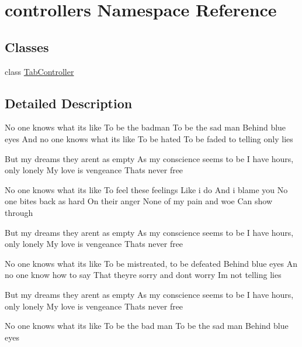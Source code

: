 \hypertarget{namespacecontrollers}{}\section{controllers Namespace Reference}
\label{namespacecontrollers}
\subsection*{Classes}
\begin{DoxyCompactItemize}
\item 
class \hyperlink{classcontrollers_1_1_tab_controller}{Tab\+Controller}
\end{DoxyCompactItemize}


\subsection{Detailed Description}
No one knows what it\textquotesingle{}s like To be the badman To be the sad man Behind blue eyes And no one knows what it\textquotesingle{}s like To be hated To be faded to telling only lies

But my dreams they aren\textquotesingle{}t as empty As my conscience seems to be I have hours, only lonely My love is vengeance That\textquotesingle{}s never free

No one knows what its like To feel these feelings Like i do And i blame you No one bites back as hard On their anger None of my pain and woe Can show through

But my dreams they aren\textquotesingle{}t as empty As my conscience seems to be I have hours, only lonely My love is vengeance That\textquotesingle{}s never free

No one knows what it\textquotesingle{}s like To be mistreated, to be defeated Behind blue eyes An no one know how to say That they\textquotesingle{}re sorry and don\textquotesingle{}t worry I\textquotesingle{}m not telling lies

But my dreams they aren\textquotesingle{}t as empty As my conscience seems to be I have hours, only lonely My love is vengeance That\textquotesingle{}s never free

No one knows what its like To be the bad man To be the sad man Behind blue eyes 